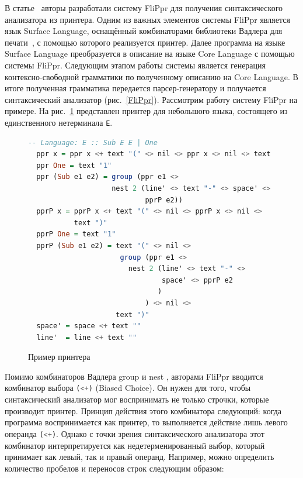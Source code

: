 В статье~\cite{Matsuda} авторы разработали систему FliPpr для получения синтаксического 
анализатора из принтера. Одним из важных элементов системы FliPpr является язык Surface Language, 
оснащённый комбинаторами библиотеки Вадлера для печати~\cite{WadlerPrinter}, с помощью которого 
реализуется принтер.
Далее программа на языке Surface Language преобразуется
в описание на языке Core Language 
с помощью системы FliPpr. Следующим этапом работы системы является генерация контексно-свободной 
грамматики по полученному описанию на Core Language. В итоге полученная грамматика передается 
парсер-генератору и получается синтаксический анализатор (рис.~\ref{FliPpr}).
Рассмотрим работу систему FliPpr на примере. На рис.~\ref{printer_example} представлен принтер 
для небольшого языка, состоящего из единственного нетерминала
\texttt{E}.
\begin{figure}[h]
\centering
\begin{lstlisting}[language=Haskell]
  -- Language: E :: Sub E E | One
  ppr x = ppr x <+ text "(" <> nil <> ppr x <> nil <> text ")"
  ppr One = text "1"
  ppr (Sub e1 e2) = group (ppr e1 <> 
                    nest 2 (line' <> text "-" <> space' <> 
                            pprP e2))
  pprP x = pprP x <+ text "(" <> nil <> pprP x <> nil <> 
           text ")"
  pprP One = text "1"
  pprP (Sub e1 e2) = text "(" <> nil <> 
                      group (ppr e1 <> 
                        nest 2 (line' <> text "-" <> 
                                space' <> pprP e2
                               )
                            ) <> nil <> 
                     text ")"
  space' = space <+ text ""
  line'  = line <+ text "" 
\end{lstlisting}
\caption{Пример принтера}
\label{printer_example}
\end{figure}

Помимо комбинаторов Вадлера
group и nest \cite{WadlerPrinter}, авторами FliPpr
вводится комбинатор выбора 
\lstinline[language=Haskell]{(<+)} (Biased Choice). Он нужен для того, чтобы синтаксический 
анализатор мог воспринимать не только строчки, которые производит принтер. Принцип действия 
этого комбинатора следующий: когда программа воспринимается как принтер, то выполняется 
действие лишь левого операнда \lstinline[language=Haskell]{(<+)}. Однако с точки зрения 
синтаксического анализатора этот комбинатор интерпретируется как недетерменированный выбор, 
который принимает как левый, так и правый операнд. Например, можно определить количество 
пробелов и переносов строк следующим образом:

